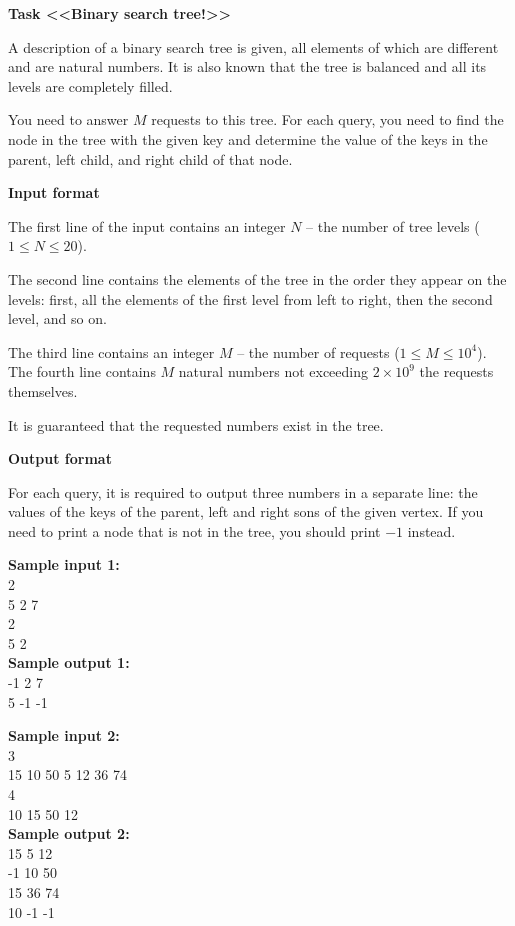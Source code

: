 \documentclass[a4paper]{article}
\begin{document}
\textbf{Task <<Binary search tree!>>}

\SPACE

A description of a binary search tree is given, all elements of which are different and are natural numbers. It is also known that the tree is balanced and all its levels are completely filled.

You need to answer $M$ requests to this tree. For each query, you need to find the node in the tree with the given key and determine the value of the keys in the parent, left child, and right child of that node.

\SPACE

\textbf{Input format}

The first line of the input contains an integer $N$ -- the number of tree levels ($1 \le N \le 20$).

The second line contains the elements of the tree in the order they appear on the levels: first, all the elements of the first level from left to right, then the second level, and so on.

The third line contains an integer $M$ -- the number of requests ($1 \le M \le 10^4$). The fourth line contains $M$ natural numbers not exceeding $2 \times 10^9$ the requests themselves.

It is guaranteed that the requested numbers exist in the tree.

\SPACE

\textbf{Output format}

For each query, it is required to output three numbers in a separate line: the values of the keys of the parent, left and right sons of the given vertex. If you need to print a node that is not in the tree, you should print $-1$ instead.

\LINE

\noindent \textbf{Sample input 1:}\\
2\\
5 2 7\\
2\\
5 2\\

\noindent \textbf{Sample output 1:}\\
-1 2 7\\
5 -1 -1\\

\SPACE

\noindent \textbf{Sample input 2:}\\
3\\
15 10 50 5 12 36 74\\
4\\
10 15 50 12\\

\noindent \textbf{Sample output 2:}\\
15 5 12\\
-1 10 50\\
15 36 74\\
10 -1 -1\\
\end{document}
